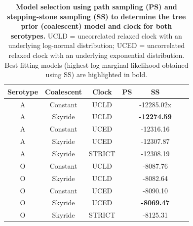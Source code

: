 \documentclass[a4paper,10pt]{article}
\begin{document}
\begin{table}[H]
\caption{\textbf{Model selection using path sampling (PS) and stepping-stone sampling (SS) to determine the tree prior (coalescent) model and clock for both serotypes.}
UCLD = uncorrelated relaxed clock with an underlying log-normal distribution; UCED = uncorrelated relaxed clock with an underlying exponential distribution.
Best fitting models (highest log marginal likelihood obtained using SS) are highlighted in bold.}
\begin{center}
\begin{tabular}{ccccccc}
\toprule
Serotype	&Coalescent	&Clock	& PS  & SS\\
\midrule
A	&Constant	&UCLD	& & -12285.02x\\
A	&Skyride 	&UCLD	& & \textbf{-12274.59}\\
A	&Constant	&UCED	& & -12316.16\\
A	&Skyride 	&UCED	& & -12307.87\\
A       &Skyride       &STRICT & & -12308.19\\
O	&Constant	&UCLD	& & -8087.76\\
O	&Skyride 	&UCLD	& & -8082.64\\
O	&Constant	&UCED	& & -8090.10\\
O	&Skyride 	&UCED	& & \textbf{-8069.47}\\
O       &Skyride       &STRICT & & -8125.31\\
\bottomrule
\end{tabular}
\end{center}
\begin{flushleft}
\end{flushleft}
\label{stab:treeclockselection}
 \end{table}
\end{document}
